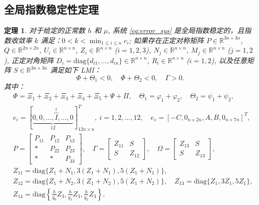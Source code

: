 \documentclass[a4paper, 12pt, oneside]{article}
\theoremstyle{cn_theorem}
\newtheorem{theorem}{定理}[section]
\begin{document}
\subsection{全局指数稳定性定理}
\begin{theorem} \label{main_theorem}
对于给定的正常数 $h$ 和 $\mu$, 系统 \eqref{eq:error_sys} 是全局指数稳定的，且指数收敛率 $k$ 满足：$0 < k < \min_{1 \le i \le n} c_i$; 如果存在正定对称矩阵 $P \in \mathbb{R}^{3n \times 3n}$, $Q \in \mathbb{R}^{2n \times 2n}$, $U_i \in \mathbb{R}^{n \times n}$, $Z_i \in \mathbb{R}^{n \times n}$ ($i=1,2,3$), $N_j \in \mathbb{R}^{n \times n}$, $M_j \in \mathbb{R}^{n \times n}$ ($j=1,2$), 正定对角矩阵 $D_i = \mathrm{diag}\{d_{i1}, \dots, d_{in}\} \in \mathbb{R}^{n \times n}$, $R_i \in \mathbb{R}^{n \times n}$ ($i=1,2$), 以及任意矩阵 $S \in \mathbb{R}^{3n \times 3n}$ 满足如下 LMI：
\begin{equation*}
    \Phi + \Theta_1 < 0, \quad \Phi + \Theta_2 < 0, \quad \Gamma > 0.
\end{equation*}
其中：
\begin{align*}
    & \Phi = \Xi_1 + \Xi_2 + \Xi_3 + \Xi_4 + \Xi_5 + \Psi + \Pi, \quad \Theta_1 = \varphi_1 + \varphi_2, \quad \Theta_2 = \psi_1 + \psi_2, \\
    & e_i = [\underbrace{0, 0, \dots, \overbrace{I}^{i}, \dots, 0}_{12}]_{12n \times n}^T, \ i=1,2,\dots,12, \quad e_s = [-C, 0_{n \times 2n}, A, B, 0_{n \times 7n}]^T, \\
    & P = \begin{bmatrix} P_{11} & P_{12} & P_{13} \\ * & P_{22} & P_{23} \\ * & * & P_{33} \end{bmatrix}, \quad \Gamma = \begin{bmatrix} Z_{11} & S \\ S & Z_{12} \end{bmatrix}, \quad \Omega = \begin{bmatrix} Z_{13} & S \\ S & Z_{13} \end{bmatrix}, \\
    & Z_{11} = \mathrm{diag}\{Z_1 + N_1, 3(Z_1 + N_1), 5(Z_1 + N_1)\}, \\
    & Z_{12} = \mathrm{diag}\{Z_1 + N_2, 3(Z_1 + N_2), 5(Z_1 + N_2)\}, \quad Z_{13} = \mathrm{diag}\{Z_1, 3Z_1, 5Z_1\}, \\
    & Z_{14} = \mathrm{diag}\left\{ \frac{h}{q_0}Z_3, \frac{h}{q_1}Z_3, \frac{h}{q_2}Z_3 \right\}, \\

\end{align*}
\end{theorem}
\end{document}
